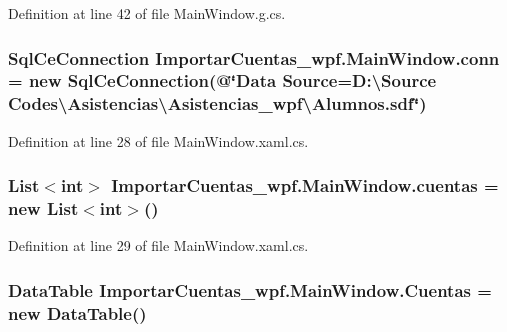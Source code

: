 Definition at line 42 of file Main\-Window.\-g.\-cs.

\hypertarget{class_importar_cuentas__wpf_1_1_main_window_a8ed2f7c907bc1c8faf75d8deb555d137}{
\subsubsection[{conn}]{\setlength{\rightskip}{0pt plus 5cm}Sql\-Ce\-Connection Importar\-Cuentas\-\_\-wpf.\-Main\-Window.\-conn = new Sql\-Ce\-Connection(@\char`\"{}Data Source=D\-:\textbackslash{}\-Source Codes\textbackslash{}\-Asistencias\textbackslash{}\-Asistencias\-\_\-wpf\textbackslash{}\-Alumnos.\-sdf\char`\"{})\hspace{0.3cm}{\ttfamily [private]}}}\label{class_importar_cuentas__wpf_1_1_main_window_a8ed2f7c907bc1c8faf75d8deb555d137}


Definition at line 28 of file Main\-Window.\-xaml.\-cs.

\hypertarget{class_importar_cuentas__wpf_1_1_main_window_a17d2ae4fd8ca55fcbe57fef1133d360a}{
\subsubsection[{cuentas}]{\setlength{\rightskip}{0pt plus 5cm}List$<$int$>$ Importar\-Cuentas\-\_\-wpf.\-Main\-Window.\-cuentas = new List$<$int$>$()\hspace{0.3cm}{\ttfamily [private]}}}\label{class_importar_cuentas__wpf_1_1_main_window_a17d2ae4fd8ca55fcbe57fef1133d360a}


Definition at line 29 of file Main\-Window.\-xaml.\-cs.

\hypertarget{class_importar_cuentas__wpf_1_1_main_window_a369b619d35d8f1d9ab8d57aa262f9111}{
\subsubsection[{Cuentas}]{\setlength{\rightskip}{0pt plus 5cm}Data\-Table Importar\-Cuentas\-\_\-wpf.\-Main\-Window.\-Cuentas = new Data\-Table()\hspace{0.3cm}{\ttfamily [private]}}}\label{class_importar_cuentas__wpf_1_1_main_window_a369b619d35d8f1d9ab8d57aa262f9111}


